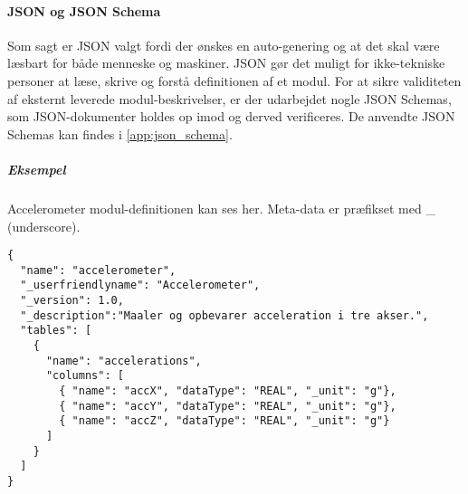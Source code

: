 \paragraph{JSON og JSON Schema}
Som sagt er JSON valgt fordi der ønskes en auto-genering og at det skal være læsbart for både menneske og maskiner.
JSON gør det muligt for ikke-tekniske personer at læse, skrive og forstå definitionen af et modul.
For at sikre validiteten af eksternt leverede modul-beskrivelser, er der udarbejdet nogle JSON Schemas, som JSON-dokumenter holdes op imod og derved verificeres.
De anvendte JSON Schemas kan findes i \cref{app:json_schema}.

\subparagraph{Eksempel} Accelerometer modul-definitionen kan ses her.
Meta-data er præfikset med \_ (underscore).
\begin{lstlisting}
{
  "name": "accelerometer",
  "_userfriendlyname": "Accelerometer",
  "_version": 1.0,
  "_description":"Maaler og opbevarer acceleration i tre akser.",
  "tables": [
    {
      "name": "accelerations",
      "columns": [
        { "name": "accX", "dataType": "REAL", "_unit": "g"},
        { "name": "accY", "dataType": "REAL", "_unit": "g"},
        { "name": "accZ", "dataType": "REAL", "_unit": "g"}
      ]
    }
  ]
}
\end{lstlisting}
